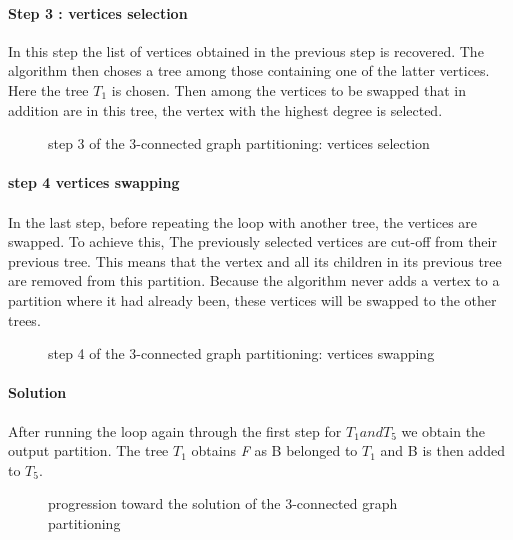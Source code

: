 \paragraph{Step 3 : vertices selection}
In this step  the list of vertices obtained in the previous step is recovered.
The algorithm then choses a tree among those containing one of the latter vertices. Here the tree $T_1$ is chosen. Then among the vertices to be swapped that in addition are in this tree, the vertex with the highest degree is selected. 

 \begin{figure}[H]
	\begin{center}
	  
	\end{center}
	\caption{step 3 of the 3-connected graph partitioning: vertices selection}
      \end{figure}


\paragraph{step 4 vertices swapping}
\paragraph{}
In the last step, before repeating the loop with another tree, the vertices are swapped. To achieve this, The previously selected vertices are cut-off from their previous tree. This means that the vertex and all its children in its previous tree are removed from this partition. Because the algorithm never adds a vertex to a partition where it had already been, these vertices will be swapped to the other trees.

 \begin{figure}[H]
	\begin{center}
	  
	\end{center}
	\caption{step 4 of the 3-connected graph partitioning: vertices swapping}
      \end{figure}


\paragraph{Solution}
After running the loop again through the first step for $T_1 and T_5$ we obtain the output partition. The tree $T_1$ obtains \emph{F} as B belonged to $T_1$ and B is then added to $T_5$.
 \begin{figure}[H]
	\begin{center}
	  
	\end{center}
	\caption{progression toward the solution of the 3-connected graph partitioning}
      \end{figure}

